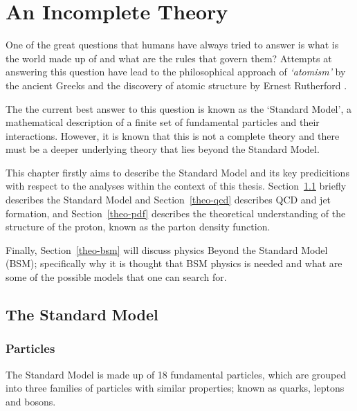 \chapter{An Incomplete Theory}
\label{sec:theo}

One of the great questions that humans have always tried to answer is
what is the world made up of and what are the rules that govern them?
Attempts at answering this question have lead to the
philosophical approach of \textit{`atomism'} by the ancient Greeks \cite{theo-atomism}
and the discovery of atomic structure by Ernest Rutherford \cite{theo-rutherford}.

The the current best answer to this question is known as the `Standard Model',
a mathematical description of a finite set of fundamental particles and their interactions.
However, it is known that this is not a complete theory and there must be
a deeper underlying theory that lies beyond the Standard Model.

This chapter firstly aims to describe the Standard Model and its key predicitions
with respect to the analyses within the context of this thesis.
Section~\ref{theo-sm} briefly describes the Standard Model and
Section~\ref{theo-qcd} describes QCD and jet formation,
and Section~\ref{theo-pdf} describes the theoretical understanding
of the structure of the proton, known as the parton density function.

Finally, Section~\ref{theo-bsm} will discuss physics Beyond the Standard Model (BSM);
specifically why it is thought that BSM physics is needed
and what are some of the possible models that one can search for.

\section{The Standard Model}
\label{theo-sm}

\subsection{Particles}

The Standard Model is made up of 18 fundamental particles,
which are grouped into three families of particles with similar properties;
known as quarks, leptons and bosons.

